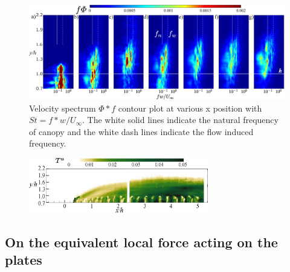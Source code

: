 \documentclass[lineno,authoryear]{FLO_v1}%
\theoremstyle{definition}
\begin{document}
\begin{figure}[]
	\centerline{\includegraphics[width=1\textwidth]{spec_piv}}
	\caption{Velocity spectrum $\Phi * f$ contour plot at various x position with $St = f * w / U_{\infty}$. The white solid lines indicate the natural frequency of canopy and the white dash lines indicate the flow induced frequency.}
	\label{flow_spectra}
\end{figure}

\begin{figure}[]
	\centerline{\includegraphics[width=0.7\textwidth]{auto}}
	\caption{}
	\label{auto}
\end{figure}

 


\subsection{On the equivalent local force acting on the plates}

\clearpage
\end{document}
